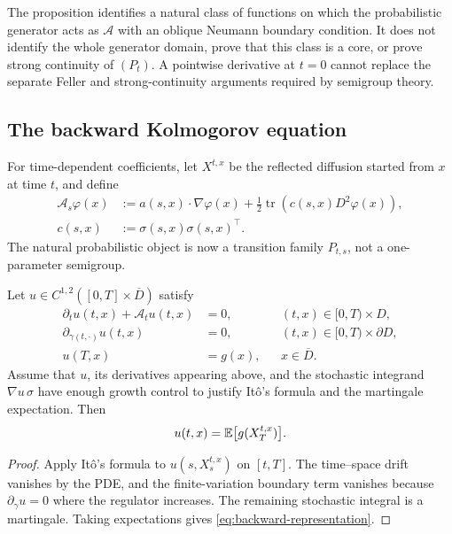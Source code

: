 \begin{remark}
The proposition identifies a natural class of functions on which the
probabilistic generator acts as $\mathcal A$ with an oblique Neumann boundary
condition. It does not identify the whole generator domain, prove that this
class is a core, or prove strong continuity of $(P_t)$. A pointwise derivative
at $t=0$ cannot replace the separate Feller and strong-continuity arguments
required by semigroup theory.
\end{remark}

\subsection{The backward Kolmogorov equation}

For time-dependent coefficients, let $X^{t,x}$ be the reflected diffusion
started from $x$ at time $t$, and define
\begin{align*}
  \mathcal A_s\varphi(x)
  &:=a(s,x)\cdot\nabla\varphi(x)
    +\frac12\operatorname{tr}\!\left(
        c(s,x)D^2\varphi(x)
      \right),\\
  c(s,x)&:=\sigma(s,x)\sigma(s,x)^\top.
\end{align*}
The natural probabilistic object is now a transition family
$P_{t,s}$, not a one-parameter semigroup.

\begin{theorem}
Let $u\in C^{1,2}([0,T]\times\overline D)$ satisfy
\begin{align*}
  \partial_tu(t,x)+\mathcal A_tu(t,x)&=0,
      &&(t,x)\in[0,T)\times D,\\
  \partial_{\gamma(t,\cdot)}u(t,x)&=0,
      &&(t,x)\in[0,T)\times\partial D,\\
  u(T,x)&=g(x), &&x\in\overline D.
\end{align*}
Assume that $u$, its derivatives appearing above, and the stochastic
integrand $\nabla u\,\sigma$ have enough growth control to justify It\^o's
formula and the martingale expectation. Then
\begin{equation}
  u(t,x)=\mathbb E\bigl[g(X_T^{t,x})\bigr]. \label{eq:backward-representation}
\end{equation}
\end{theorem}

\begin{proof}
Apply It\^o's formula to $u(s,X_s^{t,x})$ on $[t,T]$. The time--space drift
vanishes by the PDE, and the finite-variation boundary term vanishes because
$\partial_\gamma u=0$ where the regulator increases. The remaining
stochastic integral is a martingale. Taking expectations gives
\eqref{eq:backward-representation}.
\end{proof}

